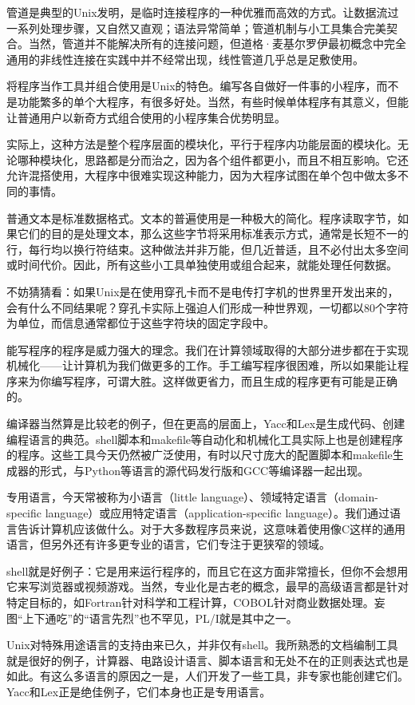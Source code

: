 \documentclass[a4paper,12pt,UTF8,twoside]{ctexbook}
\begin{document}
{{管道是典型的Unix发明，是临时连接程序的一种优雅而高效的方式。让数据流过一系列处理步骤，又自然又直观；语法异常简单；管道机制与小工具集合完美契合。当然，管道并不能解决所有的连接问题，但道格·麦基尔罗伊最初概念中完全通用的非线性连接在实践中并不经常出现，线性管道几乎总是足敷使用。

将程序当作工具并组合使用是Unix的特色。编写各自做好一件事的小程序，而不是功能繁多的单个大程序，有很多好处。当然，有些时候单体程序有其意义，但能让普通用户以新奇方式组合使用的小程序集合优势明显。

实际上，这种方法是整个程序层面的模块化，平行于程序内功能层面的模块化。无论哪种模块化，思路都是分而治之，因为各个组件都更小，而且不相互影响。它还允许混搭使用，大程序中很难实现这种能力，因为大程序试图在单个包中做太多不同的事情。

普通文本是标准数据格式。文本的普遍使用是一种极大的简化。程序读取字节，如果它们的目的是处理文本，那么这些字节将采用标准表示方式，通常是长短不一的行，每行均以换行符结束。这种做法并非万能，但几近普适，且不必付出太多空间或时间代价。因此，所有这些小工具单独使用或组合起来，就能处理任何数据。

不妨猜猜看：如果Unix是在使用穿孔卡而不是电传打字机的世界里开发出来的，会有什么不同结果呢？穿孔卡实际上强迫人们形成一种世界观，一切都以80个字符为单位，而信息通常都位于这些字符块的固定字段中。

能写程序的程序是威力强大的理念。我们在计算领域取得的大部分进步都在于实现机械化——让计算机为我们做更多的工作。手工编写程序很困难，所以如果能让程序来为你编写程序，可谓大胜。这样做更省力，而且生成的程序更有可能是正确的。

编译器当然算是比较老的例子，但在更高的层面上，Yacc和Lex是生成代码、创建编程语言的典范。shell脚本和makefile等自动化和机械化工具实际上也是创建程序的程序。这些工具今天仍然被广泛使用，有时以尺寸庞大的配置脚本和makefile生成器的形式，与Python等语言的源代码发行版和GCC等编译器一起出现。

专用语言，今天常被称为小语言（little language）、领域特定语言（domain-specific language）或应用特定语言（application-specific language）。我们通过语言告诉计算机应该做什么。对于大多数程序员来说，这意味着使用像C这样的通用语言，但另外还有许多更专业的语言，它们专注于更狭窄的领域。

shell就是好例子：它是用来运行程序的，而且它在这方面非常擅长，但你不会想用它来写浏览器或视频游戏。当然，专业化是古老的概念，最早的高级语言都是针对特定目标的，如Fortran针对科学和工程计算，COBOL针对商业数据处理。妄图“上下通吃”的“语言先烈”也不罕见，PL/I就是其中之一。

Unix对特殊用途语言的支持由来已久，并非仅有shell。我所熟悉的文档编制工具就是很好的例子，计算器、电路设计语言、脚本语言和无处不在的正则表达式也是如此。有这么多语言的原因之一是，人们开发了一些工具，非专家也能创建它们。Yacc和Lex正是绝佳例子，它们本身也正是专用语言。

}}
\end{document}
